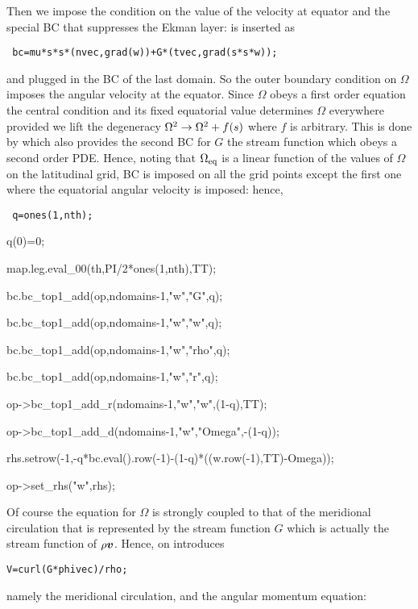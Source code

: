 \bigskip
Then we impose the condition on the value of the velocity at equator and
the special BC that suppresses the Ekman layer:
 is inserted as

\bigskip
\centerline{\tt
bc=mu*s*s*(nvec,grad(w))+G*(tvec,grad(s*s*w));
}

\bigskip
\noindent and plugged in the BC of the last domain. So the outer
boundary condition on $\Omega$ imposes the angular velocity at the
equator. Since $\Omega$ obeys a first order equation the central
condition and its fixed equatorial value determines $\Omega$ everywhere
provided we lift the degeneracy $\Omega^2\rightarrow\Omega^2+f(s)$ where $f$ is
arbitrary. This is done by  which also provides the second BC
for $G$ the stream function which obeys a second order PDE. Hence,
noting that $\Omega_{\rm eq}$ is a linear function of the values of
$\Omega$ on the latitudinal grid, BC  is imposed on all the
grid points except the first one where the equatorial angular velocity
is imposed: hence,

\bigskip
\begin{center}
{\tt
        q=ones(1,nth);  \par
        q(0)=0;  \par
        map.leg.eval\_00(th,PI/2*ones(1,nth),TT);  \par
        bc.bc\_top1\_add(op,ndomains-1,"w","G",q);  \par
        bc.bc\_top1\_add(op,ndomains-1,"w","w",q);  \par
        bc.bc\_top1\_add(op,ndomains-1,"w","rho",q);  \par
        bc.bc\_top1\_add(op,ndomains-1,"w","r",q);  \par
        op->bc\_top1\_add\_r(ndomains-1,"w","w",(1-q),TT);  \par
        op->bc\_top1\_add\_d(ndomains-1,"w","Omega",-(1-q));  \par
        rhs.setrow(-1,-q*bc.eval().row(-1)-(1-q)*((w.row(-1),TT)-Omega));  \par
        op->set\_rhs("w",rhs);  \par
}
\end{center}

Of course the equation for $\Omega$ is strongly coupled to that of the
meridional circulation that is represented by the stream function $G$
which is actually the stream function of $\rho\vv$. Hence, on introduces

\centerline{\tt V=curl(G*phivec)/rho;}
\bigskip
\noindent namely the meridional circulation, and the angular momentum equation:

